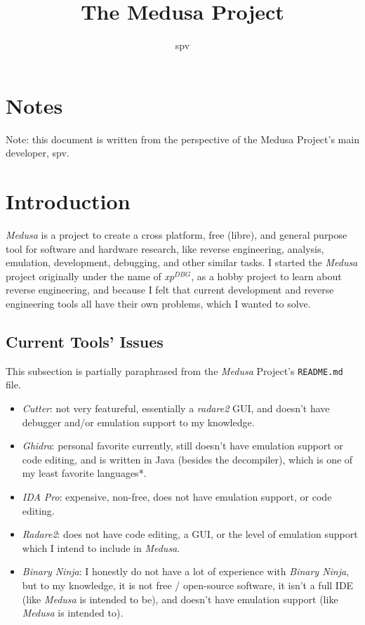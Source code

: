 \documentclass{article}
\title{The Medusa Project}
\author{spv}
\begin{document}
	\maketitle

	\section{Notes}
	Note: this document is written from the perspective of the Medusa Project's
	main developer, spv.

	\section{Introduction}
	\textit{Medusa} is a project to create a cross platform, free (libre), and
	general purpose tool for software and hardware research, like reverse
	engineering, analysis, emulation, development, debugging, and other similar
	tasks. I started the \textit{Medusa} project originally under the name of
	\textit{xp$^{DBG}$}, as a hobby project to learn about reverse engineering,
	and because I felt that current development and reverse engineering tools
	all have their own problems, which I wanted to solve.

	\subsection{Current Tools' Issues}
	This subsection is partially paraphrased from the \textit{Medusa} Project's
	\texttt{README.md} file.

	\begin{itemize}
		\item \textit{Cutter}: not very featureful, essentially a
		\textit{radare2} GUI, and doesn't have debugger and/or emulation support
		to my knowledge.
		\item \textit{Ghidra}: personal favorite currently, still doesn't have
		emulation support or code editing, and is written in Java (besides the
		decompiler), which is one of my least favorite languages*.
		\item \textit{IDA Pro}: expensive, non-free, does not have emulation
		support, or code editing.
		\item \textit{Radare2}: does not have code editing, a GUI, or the level
		of emulation support which I intend to include in \textit{Medusa}.
		\item \textit{Binary Ninja}: I honestly do not have a lot of experience
		with \textit{Binary Ninja}, but to my knowledge, it is not free / 
		open-source software, it isn't a full IDE (like \textit{Medusa} is
		intended to be), and doesn't have emulation support (like
		\textit{Medusa} is intended to).
	\end{itemize}
\end{document}
